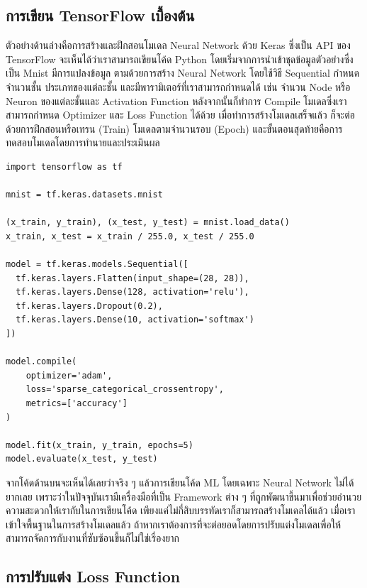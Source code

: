 \subsection{การเขียน TensorFlow เบื้องต้น}

ตัวอย่างด้านล่างคือการสร้างและฝึกสอนโมเดล Neural Network ด้วย Keras ซึ่งเป็น API ของ TensorFlow จะเห็นได้ว่าเราสามารถเขียนโค้ด 
Python โดยเริ่มจากการนำเข้าชุดข้อมูลตัวอย่างซึ่งเป็น Mnist มีการแปลงข้อมูล ตามด้วยการสร้าง Neural Network โดยใช้วิธี Sequential 
กำหนดจำนวนชั้น ประเภทของแต่ละชั้น และมีพารามิเตอร์ที่เราสามารถกำหนดได้ เช่น จำนวน Node หรือ Neuron ของแต่ละชั้นและ Activation 
Function หลังจากนั้นก็ทำการ Compile โมเดลซึ่งเราสามารถกำหนด Optimizer และ Loss Function ได้ด้วย เมื่อทำการสร้างโมเดลเสร็จแล้ว 
ก็จะต่อด้วยการฝึกสอนหรือเทรน (Train) โมเดลตามจำนวนรอบ (Epoch) และขั้นตอนสุดท้ายคือการทดสอบโมเดลโดยการทำนายและประเมินผล

\begin{lstlisting}[style=MyPython]
import tensorflow as tf

mnist = tf.keras.datasets.mnist

(x_train, y_train), (x_test, y_test) = mnist.load_data()
x_train, x_test = x_train / 255.0, x_test / 255.0

model = tf.keras.models.Sequential([
  tf.keras.layers.Flatten(input_shape=(28, 28)),
  tf.keras.layers.Dense(128, activation='relu'),
  tf.keras.layers.Dropout(0.2),
  tf.keras.layers.Dense(10, activation='softmax')
])

model.compile(
    optimizer='adam',
    loss='sparse_categorical_crossentropy',
    metrics=['accuracy']
)

model.fit(x_train, y_train, epochs=5)
model.evaluate(x_test, y_test)
\end{lstlisting}

จากโค้ดด้านบนจะเห็นได้เลยว่าจริง ๆ แล้วการเขียนโค้ด ML โดยเฉพาะ Neural Network ไม่ได้ยากเลย เพราะว่าในปัจจุบันเรามีเครื่องมือที่เป็น 
Framework ต่าง ๆ ที่ถูกพัฒนาขึ้นมาเพื่อช่วยอำนวยความสะดวกให้เรากับในการเขียนโค้ด เพียงแค่ไม่กี่สิบบรรทัดเราก็สามารถสร้างโมเดลได้แล้ว
เมื่อเราเข้าใจพื้นฐานในการสร้างโมเดลแล้ว ถ้าหากเราต้องการที่จะต่อยอดโดยการปรับแต่งโมเดลเพื่อให้สามารถจัดการกับงานที่ซับซ้อนขึ้นก็ไม่ใช่เรื่องยาก

\subsection{การปรับแต่ง Loss Function}


